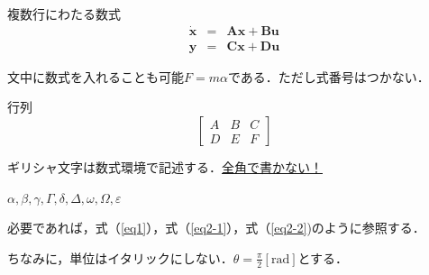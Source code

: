 複数行にわたる数式
\begin{eqnarray}
 \bm{\dot x}&=&\bm{Ax}+\bm{Bu}\label{eq2-1} \\
 \bm{y}&=&\bm{Cx}+\bm{Du}\label{eq2-2}
\end{eqnarray}

文中に数式を入れることも可能$F=m\alpha$である．ただし式番号はつかない．

行列
\begin{equation}
 \begin{bmatrix} 
  A & B & C\\ 
  D & E & F 
 \end{bmatrix}
\end{equation}

ギリシャ文字は数式環境で記述する．\underline{全角で書かない！}

$\alpha,\beta,\gamma,\Gamma,\delta,\Delta,\omega,\Omega,\varepsilon$

必要であれば，式（\ref{eq1}），式（\ref{eq2-1}），式（\ref{eq2-2})のように参照する．

ちなみに，単位はイタリックにしない．$\theta=\frac{\pi}{2}[\mathrm{rad}]$とする．
